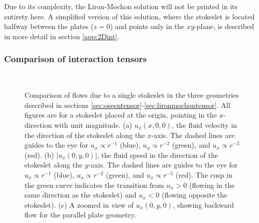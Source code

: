\documentclass[11pt]{ucthesis}
\begin{document}
Due to its complexity, the Liron-Mochon solution will not be printed in its entirety here. A simplified version of this solution, where the stokeslet is located halfway between the plates ($z=0$) and points only in the $xy$-plane, is described in more detail in section \ref{app:2Dint}.

\subsubsection{Comparison of interaction tensors}

\begin{figure}
\centering
{}
\ \\
\caption{Comparison of flows due to a single stokeslet in the three geometries described in sections \ref{sec:oseentensor}-\ref{sec:lironmochontensor}. All figures are for a stokeslet placed at the origin, pointing in the $x$-direction with unit magnitude. (a) $u_x(x,0,0)$, the fluid velocity in the direction of the stokeslet along the $x$-axis. The dashed lines are guides to the eye for $u_x\propto r^{-1}$ (blue), $u_x\propto r^{-2}$ (green), and $u_x\propto r^{-3}$ (red). (b) $|u_x(0,y,0)|$, the fluid speed in the direction of the stokeslet along the $y$-axis. The dashed lines are guides to the eye for $u_x\propto r^{-1}$ (blue), $u_x\propto r^{-2}$ (green), and $u_x\propto r^{-5}$ (red). The cusp in the green curve indicates the transition from $u_x>0$ (flowing in the same direction as the stokeslet) and $u_x<0$ (flowing opposite the stokeslet). (c) A zoomed in view of $u_x(0,y,0)$, showing backward flow for the parallel plate geometry.
\label{fig:tensor_comparison}
}
\end{figure}
\end{document}
